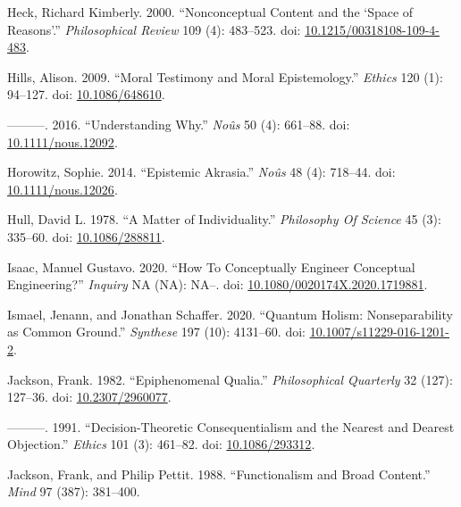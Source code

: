 \documentclass[
  10pt,
  letterpaper,
  DIV=11,
  numbers=noendperiod,
  twoside]{scrartcl}
\newlength{\cslhangindent}
\newenvironment{CSLReferences}[2] %
 {\begin{list}{}{%
  \setlength{\itemindent}{0pt}
  \setlength{\leftmargin}{0pt}
  \setlength{\parsep}{0pt}
  \ifodd #1
   \setlength{\leftmargin}{\cslhangindent}
   \setlength{\itemindent}{-1\cslhangindent}
  \fi
  \setlength{\itemsep}{#2\baselineskip}}}
 {\end{list}}
\begin{document}
\begin{CSLReferences}{1}{0}
Heck, Richard Kimberly. 2000. {``Nonconceptual Content and the {`Space
of Reasons'}.''} \emph{Philosophical Review} 109 (4): 483--523. doi:
\href{https://doi.org/10.1215/00318108-109-4-483}{10.1215/00318108-109-4-483}.

Hills, Alison. 2009. {``Moral Testimony and Moral Epistemology.''}
\emph{Ethics} 120 (1): 94--127. doi:
\href{https://doi.org/10.1086/648610}{10.1086/648610}.

---------. 2016. {``Understanding Why.''} \emph{Noûs} 50 (4): 661--88.
doi: \href{https://doi.org/10.1111/nous.12092}{10.1111/nous.12092}.

Horowitz, Sophie. 2014. {``Epistemic Akrasia.''} \emph{Noûs} 48 (4):
718--44. doi:
\href{https://doi.org/10.1111/nous.12026}{10.1111/nous.12026}.

Hull, David L. 1978. {``A Matter of Individuality.''} \emph{Philosophy
Of Science} 45 (3): 335--60. doi:
\href{https://doi.org/10.1086/288811}{10.1086/288811}.

Isaac, Manuel Gustavo. 2020. {``How To Conceptually Engineer Conceptual
Engineering?''} \emph{Inquiry} NA (NA): NA--. doi:
\href{https://doi.org/10.1080/0020174X.2020.1719881}{10.1080/0020174X.2020.1719881}.

Ismael, Jenann, and Jonathan Schaffer. 2020. {``Quantum Holism:
Nonseparability as Common Ground.''} \emph{Synthese} 197 (10): 4131--60.
doi:
\href{https://doi.org/10.1007/s11229-016-1201-2}{10.1007/s11229-016-1201-2}.

Jackson, Frank. 1982. {``Epiphenomenal Qualia.''} \emph{Philosophical
Quarterly} 32 (127): 127--36. doi:
\href{https://doi.org/10.2307/2960077}{10.2307/2960077}.

---------. 1991. {``Decision-Theoretic Consequentialism and the Nearest
and Dearest Objection.''} \emph{Ethics} 101 (3): 461--82. doi:
\href{https://doi.org/10.1086/293312}{10.1086/293312}.

Jackson, Frank, and Philip Pettit. 1988. {``Functionalism and Broad
Content.''} \emph{Mind} 97 (387): 381--400.


\end{CSLReferences}
\end{document}

